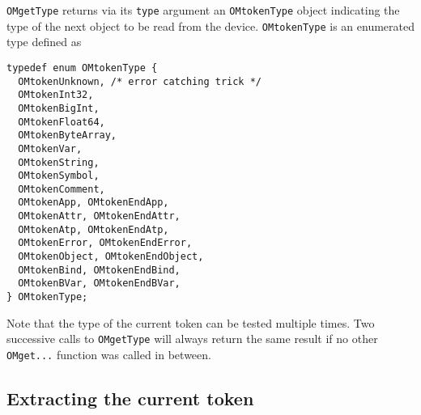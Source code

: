 \documentclass{article}
\begin{document}
{\tt OMgetType} returns via its {\tt type} argument an {\tt OMtokenType}
object indicating the type of the next object to be read from the device. 
{\tt OMtokenType} is an enumerated type defined as 
\begin{verbatim} 
typedef enum OMtokenType {
  OMtokenUnknown, /* error catching trick */
  OMtokenInt32,
  OMtokenBigInt,
  OMtokenFloat64,
  OMtokenByteArray,
  OMtokenVar,
  OMtokenString,
  OMtokenSymbol,
  OMtokenComment,
  OMtokenApp, OMtokenEndApp,
  OMtokenAttr, OMtokenEndAttr,
  OMtokenAtp, OMtokenEndAtp,
  OMtokenError, OMtokenEndError,
  OMtokenObject, OMtokenEndObject,
  OMtokenBind, OMtokenEndBind, 
  OMtokenBVar, OMtokenEndBVar,
} OMtokenType;
\end{verbatim} 
Note that the type of the current token can be tested multiple times. Two
successive calls to {\tt OMgetType} will always return the same result if no
other {\tt OMget...} function was called in between. 

\subsection{Extracting the current token}
\end{document}
